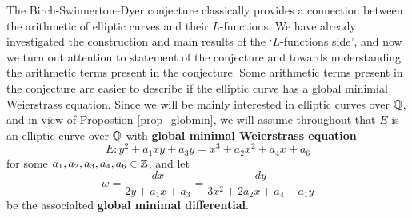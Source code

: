 The Birch-Swinnerton--Dyer conjecture classically provides a connection between the arithmetic of elliptic curves and their $L$-functions. We have already investigated the construction and main results of the `$L$-functions side', and now we turn out attention to statement of the conjecture and towards understanding the arithmetic terms present in the conjecture. Some arithmetic terms present in the conjecture are easier to describe if the elliptic curve has a global minimial Weierstrass equation. Since we will be mainly interested in elliptic curves over $\mathbb{Q}$, and in view of Propostion \ref*{prop_globmin}, we will assume throughout that $E$ is an elliptic curve over $\mathbb{Q}$ with \textbf{global minimal Weierstrass equation}
$$E:y^2+a_1xy+a_3y=x^3+a_2x^2+a_4x+a_6$$ 
for some $a_1,a_2,a_3,a_4,a_6\in\mathbb{Z}$, and let 
$$w=\frac{dx}{2y+a_1x+a_3}=\frac{dy}{3x^2+2a_2x+a_4-a_1y}$$
be the associalted \textbf{global minimal differential}.



%

